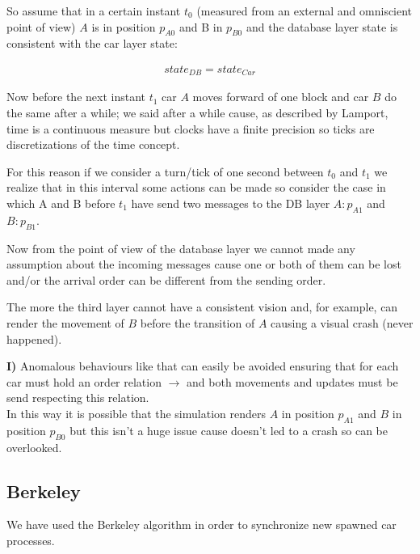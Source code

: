 So assume that in a certain instant $t_0$ 
(measured from an external and omniscient point of view) 
$A$ is in position $p_{A0}$ and B in $p_{B0}$ and 
the database layer state is consistent with the car layer state:

\begin{equation}\begin{split}
    state_{DB} = state_{Car}
\end{split}\end{equation} 

\noindent
Now before the next instant $t_1$ car $A$ moves forward of one block and car $B$
do the same after a while; we said after a while cause, as described by Lamport,
time is a continuous measure but clocks have a finite precision so 
ticks are discretizations of the time concept. 

For this reason if we consider a turn/tick 
of one second between $t_0$ and $t_1$ we realize that in this interval some 
actions can be made so consider the case in which A and B before $t_1$ 
have send two messages to the DB layer $A:p_{A1}$ and $B:p_{B1}$.

Now from the point of view of the database layer we cannot made any assumption 
about the incoming messages cause one or both of them can be lost and/or the 
arrival order can be different from the sending order. 

The more the third layer cannot have a consistent vision and, for example, 
can render the movement of $B$ before the transition of $A$ causing 
a visual crash (never happened).\\

\begin{tcolorbox}
\textbf{I)} Anomalous behaviours like that can easily be avoided ensuring that 
for each car must hold an order relation $\rightarrow$ and both movements 
and updates must be send respecting this relation.\\

In this way it is possible 
that the simulation renders $A$ in position $p_{A1}$ and $B$ in position 
$p_{B0}$ but this isn't a huge issue cause doesn't led to a crash so 
can be overlooked.
\end{tcolorbox}

\subsection{Berkeley}

We have used the Berkeley algorithm in order to synchronize new spawned car processes.

